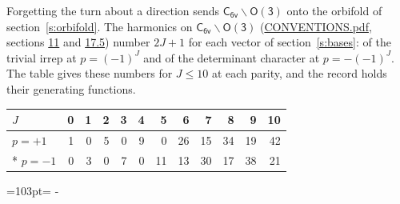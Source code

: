 \documentclass[10pt,a4paper]{article}
\newcommand{\needspace}[1]{\par\penalty-100\begingroup\dimen0=#1\relax\dimen2=\pagegoal
  \advance\dimen2-\pagetotal\ifdim\dimen0>\dimen2\relax\ifdim\dimen2>0pt\vfil\break\fi\fi
  \endgroup}
\numberwithin{equation}{section}
\newcommand{\grp}[1]{\mathsf{#1}}
\begin{document}
Forgetting the turn about a direction sends $\grp{C_{6v}}\backslash\grp{O(3)}$ onto the orbifold of section~\ref{s:orbifold}.
The harmonics on $\grp{C_{6v}}\backslash\grp{O(3)}$ (\href{../../CONVENTIONS.pdf}{CONVENTIONS.pdf}, sections \href{../../CONVENTIONS.pdf\#conv.11}{11} and \href{../../CONVENTIONS.pdf\#conv.17.5}{17.5}) number $2J + 1$ for each vector of section~\ref{s:bases}: of the trivial irrep at $p = (-1)^J$ and of the determinant character at $p = -(-1)^J$. The table gives these numbers for $J \le 10$ at each parity, and the record holds their generating functions.
{\small\setlength{\tabcolsep}{4pt}\begin{longtable}{@{}lrrrrrrrrrrr@{}}\toprule
$J$ & 0 & 1 & 2 & 3 & 4 & 5 & 6 & 7 & 8 & 9 & 10\\\midrule\endhead
\bottomrule\endfoot\endlastfoot
$p = +1$ & 1 & 0 & 5 & 0 & 9 & 0 & 26 & 15 & 34 & 19 & 42\\*
$p = -1$ & 0 & 3 & 0 & 7 & 0 & 11 & 13 & 30 & 17 & 38 & 21\\
\bottomrule\end{longtable}}
\needspace{103pt}
\end{document}
